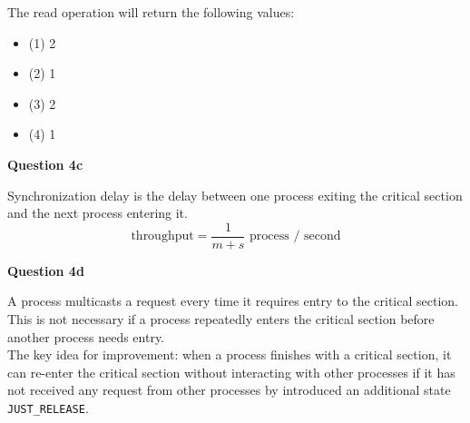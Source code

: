 \documentclass[11pt,a4paper]{report}
\begin{document}
\begin{multicols*}{2}
\noindent The read operation will return the following values:
\begin{itemize}
  \item (1) 2
  \item (2) 1
  \item (3) 2
  \item (4) 1
\end{itemize}

\noindent \textbf{Question 4c}

\noindent Synchronization delay is the delay between one process exiting the critical section and the next process entering it.\\

$$\text{throughput} = \frac{1}{m+s} \text{ process / second}$$

\noindent \textbf{Question 4d}

\noindent A process multicasts a request every time it requires entry to the critical section. This is not necessary if a process repeatedly enters the critical section before another process needs entry. \\

\noindent The key idea for improvement: when a process finishes with a critical section, it can re-enter the critical section without interacting with other processes if it has not received any request from other processes by introduced an additional state \verb|JUST_RELEASE|.

\end{multicols*}
\end{document}
